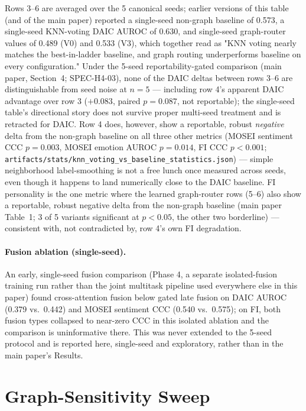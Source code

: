 \documentclass[letterpaper]{article}
\begin{document}
Rows 3--6 are averaged over the 5 canonical seeds; earlier versions of this table (and of the main paper) reported a single-seed non-graph baseline of 0.573, a single-seed KNN-voting DAIC AUROC of 0.630, and single-seed graph-router values of 0.489 (V0) and 0.533 (V3), which together read as "KNN voting nearly matches the best-in-ladder baseline, and graph routing underperforms baseline on every configuration." Under the 5-seed reportability-gated comparison (main paper, Section~4; SPEC-H4-03), none of the DAIC deltas between rows 3--6 are distinguishable from seed noise at $n{=}5$ — including row 4's apparent DAIC advantage over row 3 ($+0.083$, paired $p{=}0.087$, not reportable); the single-seed table's directional story does not survive proper multi-seed treatment and is retracted for DAIC. Row 4 does, however, show a reportable, robust \emph{negative} delta from the non-graph baseline on all three other metrics (MOSEI sentiment CCC $p{=}0.003$, MOSEI emotion AUROC $p{=}0.014$, FI CCC $p{<}0.001$; \texttt{artifacts/stats/knn\_voting\_vs\_baseline\_statistics.json}) — simple neighborhood label-smoothing is not a free lunch once measured across seeds, even though it happens to land numerically close to the DAIC baseline. FI personality is the one metric where the learned graph-router rows (5--6) also show a reportable, robust negative delta from the non-graph baseline (main paper Table~1; 3 of 5 variants significant at $p<0.05$, the other two borderline) — consistent with, not contradicted by, row 4's own FI degradation.

\paragraph{Fusion ablation (single-seed).} An early, single-seed fusion comparison (Phase 4, a separate isolated-fusion training run rather than the joint multitask pipeline used everywhere else in this paper) found cross-attention fusion below gated late fusion on DAIC AUROC (0.379 vs.\ 0.442) and MOSEI sentiment CCC (0.540 vs.\ 0.575); on FI, both fusion types collapsed to near-zero CCC in this isolated ablation and the comparison is uninformative there. This was never extended to the 5-seed protocol and is reported here, single-seed and exploratory, rather than in the main paper's Results.

\section{Graph-Sensitivity Sweep}
\end{document}
